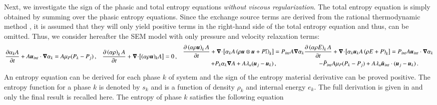 \documentclass[preprint,10pt]{elsarticle}
\begin{document}
Next, we investigate the sign of the phasic and total entropy equations \emph{without viscous regularization}. The total entropy equation is simply obtained by summing over the phasic entropy equations. Since the exchange source terms are derived from the rational thermodynamic method \cite{Truesdell}, it is assumed that they will only yield positive terms in the right-hand side of the total entropy equation and thus, can be omitted. Thus, we consider hereafter the SEM model with only pressure and velocity relaxation terms:
\begin{subequations}\label{eq:liq-7-eqn-sect5_no_exchange}
\begin{align}
  \label{eqn:multi-d-7-eqn-liq-vol_no_exchange}
  \frac{\partial \alpha_{k} A}{\partial t} + A\mbold u_{int} \cdot \grad \alpha_{k}
  &= A \mu_P (P_{k} - P_{j}) \,,
\end{align}
\begin{align}
  \label{multi-d-7-equ-liq_no_exchange}
  \frac{\partial \left( \alpha \rho \right)_{k} A}{\partial t}
  + \div \left[ (\alpha \rho \mbold u)_{k} A \right]
  &= 0 \,,
\end{align}
\begin{multline}
  \frac{\partial \left( \alpha \rho \mbold u \right)_{k} A}{\partial t}
  + \div \left[ \alpha_{k} A \left( \rho \mbold u \otimes \mbold u + P \mathbb{I} \right)_{k} \right]
  = P_{int} A \grad \alpha_{k} \\ + P_{k} \alpha_{k} \grad A
  + A \lambda_u (\mbold u_{j} - \mbold u_{k})\,,
\end{multline}
\begin{multline}
  \frac{\partial \left( \alpha \rho E \right)_{k} A}{\partial t}
  + \div \left[ \alpha_{k} \mbold u_{k} A \left( \rho E + P \right)_{k} \right]
  = P_{int} A \mbold u_{int} \cdot \grad \alpha_{k} \\ - \bar{P}_{int} A \mu_P (P_{k} - P_{j})
  + A \lambda_u \bar{\mbold u}_{int} \cdot (\mbold u_{j} - \mbold u_{k}) \,.
\end{multline}
\end{subequations}
%
An entropy equation can be derived for each phase $k$ of system 
%
and the sign of the entropy material derivative can be proved positive. The entropy function for a phase $k$ is denoted by $s_k$ and is a function of density $\rho_k$ and internal energy $e_k$. The full derivation is given in  and only the final result is recalled here. The entropy of phase $k$ satisfies the following equation
\end{document}
